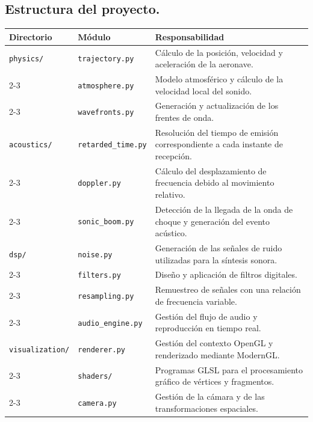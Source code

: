 \documentclass[10.5pt]{article}
\begin{document}
	\subsection{Estructura del proyecto.}
	
	\begin{table}[H]
		\centering
		\label{tab:estructura}
		\begin{tabular}{|l|p{4cm}|p{10cm}|}
			\hline
			\textbf{Directorio} & \textbf{Módulo} & \textbf{Responsabilidad} \\
			\hline
			\texttt{physics/} &
			\texttt{trajectory.py} &
			Cálculo de la posición, velocidad y aceleración de la aeronave. \\
			\cline{2-3}
			&
			\texttt{atmosphere.py} &
			Modelo atmosférico y cálculo de la velocidad local del sonido. \\
			\cline{2-3}
			&
			\texttt{wavefronts.py} &
			Generación y actualización de los frentes de onda. \\
			\hline
			\texttt{acoustics/} &
			\texttt{retarded\_time.py} &
			Resolución del tiempo de emisión correspondiente a cada instante de recepción. \\
			\cline{2-3}
			&
			\texttt{doppler.py} &
			Cálculo del desplazamiento de frecuencia debido al movimiento relativo. \\
			\cline{2-3}
			&
			\texttt{sonic\_boom.py} &
			Detección de la llegada de la onda de choque y generación del evento acústico. \\
			\hline
			\texttt{dsp/} &
			\texttt{noise.py} &
			Generación de las señales de ruido utilizadas para la síntesis sonora. \\
			\cline{2-3}
			&
			\texttt{filters.py} &
			Diseño y aplicación de filtros digitales. \\
			\cline{2-3}
			&
			\texttt{resampling.py} &
			Remuestreo de señales con una relación de frecuencia variable. \\
			\cline{2-3}
			&
			\texttt{audio\_engine.py} &
			Gestión del flujo de audio y reproducción en tiempo real. \\
			\hline
			\texttt{visualization/} &
			\texttt{renderer.py} &
			Gestión del contexto OpenGL y renderizado mediante ModernGL. \\
			\cline{2-3}
			&
			\texttt{shaders/} &
			Programas GLSL para el procesamiento gráfico de vértices y fragmentos. \\
			\cline{2-3}
			&
			\texttt{camera.py} &
			Gestión de la cámara y de las transformaciones espaciales. \\

\end{tabular}
\end{table}
\end{document}
